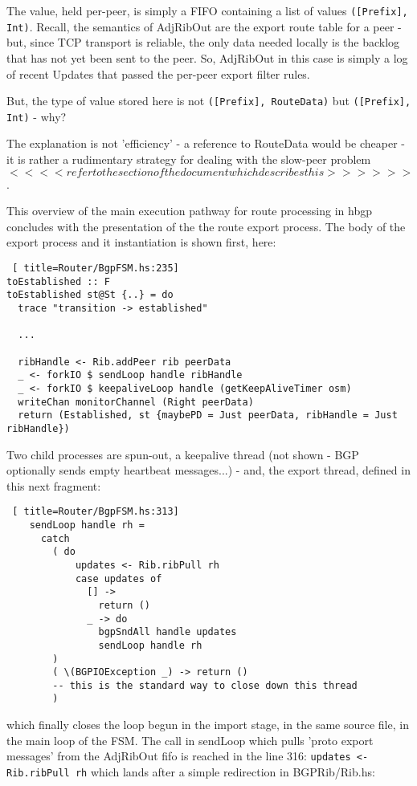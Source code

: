 The value, held per-peer, is simply a FIFO containing a list of values \lstinline{([Prefix], Int)}.  Recall, the semantics of AdjRibOut are the export route table for a peer - but, since TCP transport is reliable, the only data needed locally is the backlog that has not yet been sent to the peer.  So,  AdjRibOut in this case is simply a log of recent Updates that passed the per-peer export filter rules.

But, the type of value stored here is not \lstinline{([Prefix], RouteData)} but \lstinline{([Prefix], Int)} - why?

The explanation is not 'efficiency' - a reference to RouteData would be cheaper - it is rather a rudimentary strategy for dealing with the slow-peer problem $<<<< refer to the section of the document which describes this  >>>>>>$.

This overview of the main execution pathway for route processing in hbgp concludes with the presentation of the the route export process.  The body of the export process and it instantiation is shown first, here:  

\begin{lstlisting} [ title=Router/BgpFSM.hs:235]
toEstablished :: F
toEstablished st@St {..} = do
  trace "transition -> established"

  ...
  
  ribHandle <- Rib.addPeer rib peerData
  _ <- forkIO $ sendLoop handle ribHandle
  _ <- forkIO $ keepaliveLoop handle (getKeepAliveTimer osm)
  writeChan monitorChannel (Right peerData)
  return (Established, st {maybePD = Just peerData, ribHandle = Just ribHandle})
\end{lstlisting}

Two child processes are spun-out, a keepalive thread (not shown - BGP optionally sends empty heartbeat messages...) - and, the export thread, defined in this next fragment:

\begin{lstlisting} [ title=Router/BgpFSM.hs:313]
    sendLoop handle rh =
      catch
        ( do
            updates <- Rib.ribPull rh
            case updates of
              [] ->
                return ()             
              _ -> do
                bgpSndAll handle updates
                sendLoop handle rh
        )
        ( \(BGPIOException _) -> return ()
        -- this is the standard way to close down this thread
        )
\end{lstlisting}

which finally closes the loop begun in the import stage, in the same source file, in the main loop of the FSM.  The call in  sendLoop which pulls 'proto export messages' from the AdjRibOut fifo is reached in the line 316: \lstinline{updates <- Rib.ribPull rh} which lands after a simple redirection in BGPRib/Rib.hs:

